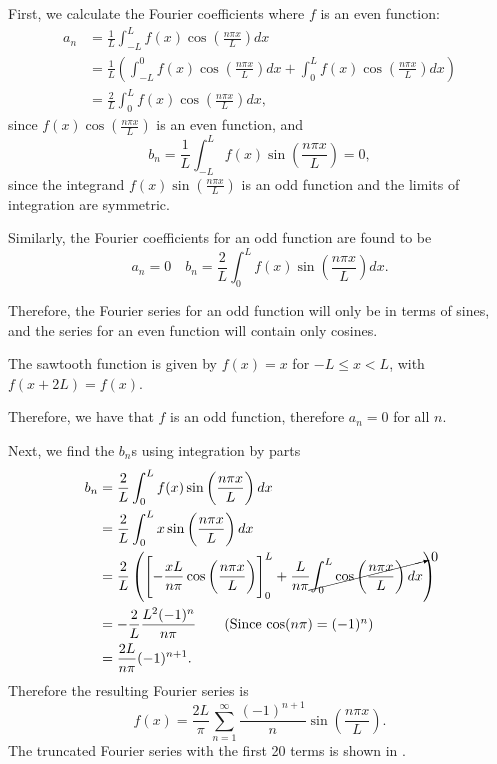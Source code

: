 First, we calculate the Fourier coefficients where $f$ is an even function:
\begin{align*}
	a_n &= \frac{1}{L} \int_{-L}^L f(x)\cos\left(\frac{n\pi x}{L}\right) dx \\
	&= \frac{1}{L} \left(\int_{-L}^0 f(x)\cos\left(\frac{n\pi x}{L}\right) dx + \int_0^L f(x)\cos\left(\frac{n\pi x}{L}\right) dx\right) \\
	&= \frac{2}{L} \int_0^L f(x)\cos\left(\frac{n\pi x}{L}\right) dx,
\end{align*}
since $f(x)\cos\left(\frac{n\pi x}{L}\right)$ is an even function, and
\[
b_n = \frac{1}{L} \int_{-L}^L f(x)\sin\left(\frac{n\pi x}{L}\right) = 0,
\]
since the integrand $f(x)\sin\left(\frac{n\pi x}{L}\right)$ is an odd function and the limits of integration are symmetric.

Similarly, the Fourier coefficients for an odd function are found to be
\[
a_n = 0 \quad b_n = \frac{2}{L} \int_0^L f(x)\sin\left(\frac{n\pi x}{L}\right) dx.
\]

Therefore, the Fourier series for an odd function will only be in terms of sines, and the series for an even function will contain only cosines.

\begin{eg}\label{eg:sawtooth}
	The sawtooth function is given by $f(x)=x$ for $-L\leq x<L$, with $f(x+2L) = f(x)$.
	
	Therefore, we have that $f$ is an odd function, therefore $a_n = 0$ for all $n$.
	
	Next, we find the $b_n$s using integration by parts
	\begin{align*}
		b_n &= \frac{2}{L} \int_0^L f(x)\sin\left(\frac{n\pi x}{L}\right) dx \\
		&= \frac{2}{L} \int_0^L x\sin\left(\frac{n\pi x}{L}\right) dx \\
		&= \frac{2}{L} \left(\left[ -\frac{xL}{n\pi}\cos\left(\frac{n\pi x}{L}\right) \right]_0^L + \frac{L}{n\pi}\cancelto{0}{\int_0^L \cos\left(\frac{n\pi x}{L}\right) dx} \right) \\
		&= -\frac{2}{L} \frac{L^2 (-1)^n}{n\pi} \tag{Since $\cos(n\pi) = (-1)^n$} \\
		&= \frac{2L}{n\pi}(-1)^{n+1}.
	\end{align*}
	Therefore the resulting Fourier series is
	\[
	f(x) = \frac{2L}{\pi} \sum_{n=1}^{\infty} \frac{(-1)^{n+1}}{n} \sin\left(\frac{n\pi x}{L}\right).
	\]
	The truncated Fourier series with the first 20 terms is shown in .
\end{eg}

